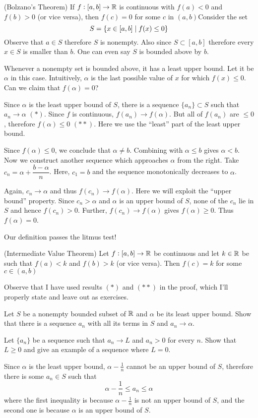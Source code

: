 \begin{SWP}{\thm}{(Bolzano's Theorem) If $f: [a, b] \rightarrow \mathbb{R}$ is continuous with $f(a) < 0$ and $f(b) > 0$ (or vice versa), then $f(c) = 0$ for some $c$ in $(a, b)$}Consider the set$$S = \{x \in [a, b] \space \mid \space f(x) \leq 0\}$$
Observe that $a \in S$ therefore $S$ is nonempty. Also since $S \subset [a, b]$ therefore every $x \in S$ is smaller than $b$. One can even say $S$ is bounded above by $b$.

Whenever a nonempty set is bounded above, it has a least upper bound. Let it be $\alpha$ in this case. Intuitively, $\alpha$ is the last possible value of $x$ for which $f(x) \leq 0$. Can we claim that $f(\alpha) = 0$?

Since $\alpha$ is the least upper bound of $S$, there is a sequence $\{a_n\} \subset S$ such that $a_n \rightarrow \alpha$ $(\ast)$. Since $f$ is continuous, $f(a_n) \rightarrow f(\alpha)$. But all of $f(a_n)$ are $\leq 0$, therefore $f(\alpha) \leq 0$ $(\ast \ast)$. Here we use the ``least'' part of the least upper bound.

Since $f(\alpha) \leq 0$, we conclude that $\alpha \neq b$. Combining with $\alpha \leq b$ gives $\alpha < b$. Now we construct another sequence which approaches $\alpha$ from the right. Take $c_n = \alpha + \dfrac{b - \alpha}{n}$. Here, $c_1 = b$ and the sequence monotonically decreases to $\alpha$.

Again, $c_n \rightarrow \alpha$ and thus $f(c_n) \rightarrow f(\alpha)$. Here we will exploit the ``upper bound'' property. Since $c_n > \alpha$ and $\alpha$ is an upper bound of $S$, none of the $c_n$ lie in $S$ and hence $f(c_n) > 0$. Further, $f(c_n) \rightarrow f(\alpha)$ gives $f(\alpha) \geq 0$. Thus $f(\alpha) = 0$.
\end{SWP}
Our definition passes the litmus test!
\begin{SNP}{\crl}{(Intermediate Value Theorem) Let $f:[a,b] \rightarrow \mathbb{R}$ be continuous and let $k \in \mathbb{R}$ be such that $f(a) < k$ and $f(b) > k$ (or vice versa). Then $f(c) = k$ for some $c \in (a, b)$}
\end{SNP}

Observe that I have used results $(\ast)$ and $(\ast \ast)$ in the proof, which I'll properly state and leave out as exercises.

\begin{SNP}{\ex}{Let $S$ be a nonempty bounded subset of $\mathbb{R}$ and $\alpha$ be its least upper bound. Show that there is a sequence $a_n$ with all its terms in $S$ and $a_n \rightarrow \alpha$}.
\end{SNP}
\begin{SNP}{\ex}{Let $\{a_n\}$ be a sequence such that $a_n \rightarrow L$ and $a_n > 0$ for every $n$. Show that $L \geq 0$ and give an example of a sequence where $L = 0$}.
\end{SNP}
\AnswerSection
\ans Since $\alpha$ is the least upper bound, $\alpha - \frac{1}{n}$ cannot be an upper bound of $S$, therefore there is some $a_n \in S$ such that
$$
\alpha - \dfrac 1 n \leq a_n \leq \alpha
$$
where the first inequality is because $\alpha - \frac 1 n$ is not an upper bound of $S$, and the second one is because $\alpha$ is an upper bound of $S$.

